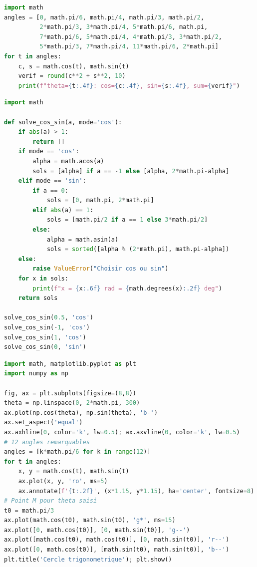 
\begin{lstlisting}[language=Python]
import math
angles = [0, math.pi/6, math.pi/4, math.pi/3, math.pi/2,
          2*math.pi/3, 3*math.pi/4, 5*math.pi/6, math.pi,
          7*math.pi/6, 5*math.pi/4, 4*math.pi/3, 3*math.pi/2,
          5*math.pi/3, 7*math.pi/4, 11*math.pi/6, 2*math.pi]
for t in angles:
    c, s = math.cos(t), math.sin(t)
    verif = round(c**2 + s**2, 10)
    print(f"theta={t:.4f}: cos={c:.4f}, sin={s:.4f}, sum={verif}")
\end{lstlisting}


\begin{lstlisting}[language=Python]
import math

def solve_cos_sin(a, mode='cos'):
    if abs(a) > 1:
        return []
    if mode == 'cos':
        alpha = math.acos(a)
        sols = [alpha] if a == -1 else [alpha, 2*math.pi-alpha]
    elif mode == 'sin':
        if a == 0:
            sols = [0, math.pi, 2*math.pi]
        elif abs(a) == 1:
            sols = [math.pi/2 if a == 1 else 3*math.pi/2]
        else:
            alpha = math.asin(a)
            sols = sorted([alpha % (2*math.pi), math.pi-alpha])
    else:
        raise ValueError("Choisir cos ou sin")
    for x in sols:
        print(f"x = {x:.6f} rad = {math.degrees(x):.2f} deg")
    return sols

solve_cos_sin(0.5, 'cos')
solve_cos_sin(-1, 'cos')
solve_cos_sin(1, 'cos')
solve_cos_sin(0, 'sin')
\end{lstlisting}


\begin{lstlisting}[language=Python]
import math, matplotlib.pyplot as plt
import numpy as np

fig, ax = plt.subplots(figsize=(8,8))
theta = np.linspace(0, 2*math.pi, 300)
ax.plot(np.cos(theta), np.sin(theta), 'b-')
ax.set_aspect('equal')
ax.axhline(0, color='k', lw=0.5); ax.axvline(0, color='k', lw=0.5)
# 12 angles remarquables
angles = [k*math.pi/6 for k in range(12)]
for t in angles:
    x, y = math.cos(t), math.sin(t)
    ax.plot(x, y, 'ro', ms=5)
    ax.annotate(f'{t:.2f}', (x*1.15, y*1.15), ha='center', fontsize=8)
# Point M pour theta saisi
t0 = math.pi/3
ax.plot(math.cos(t0), math.sin(t0), 'g*', ms=15)
ax.plot([0, math.cos(t0)], [0, math.sin(t0)], 'g--')
ax.plot([math.cos(t0), math.cos(t0)], [0, math.sin(t0)], 'r--')
ax.plot([0, math.cos(t0)], [math.sin(t0), math.sin(t0)], 'b--')
plt.title('Cercle trigonometrique'); plt.show()
\end{lstlisting}

